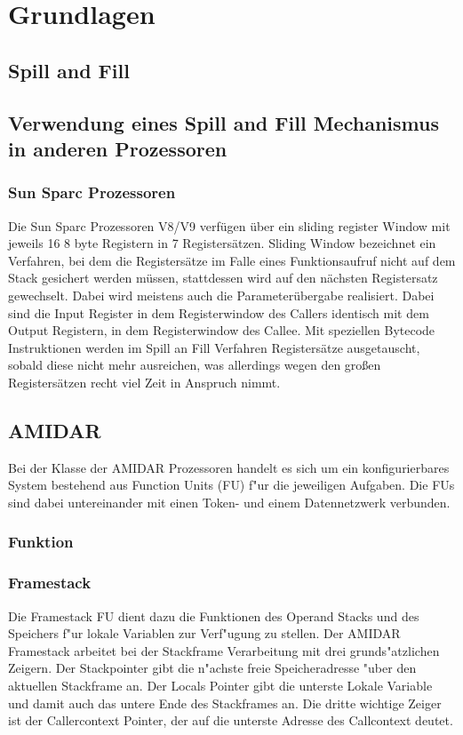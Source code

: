 \chapter{Grundlagen}
\label{cha:Grundlagen}

\section{Spill and Fill}
\section{Verwendung eines Spill and Fill Mechanismus in anderen Prozessoren}
\subsection{Sun Sparc Prozessoren}
Die Sun Sparc Prozessoren V8/V9 verf\"ugen \"uber ein sliding register Window mit jeweils 16 8 byte Registern in 7 Registers\"atzen. Sliding Window bezeichnet ein Verfahren, bei dem die Registers\"atze im Falle eines Funktionsaufruf nicht auf dem Stack gesichert werden m\"ussen, stattdessen wird auf den n\"achsten Registersatz gewechselt. Dabei wird meistens auch die Parameter\"ubergabe realisiert. Dabei sind die Input Register in dem Registerwindow des Callers identisch mit dem Output Registern, in dem Registerwindow des Callee.   
Mit speziellen Bytecode Instruktionen werden im Spill an Fill Verfahren Registers\"atze ausgetauscht, sobald diese nicht mehr ausreichen, was allerdings wegen den großen Registers\"atzen recht viel Zeit in Anspruch nimmt.
\section{AMIDAR}
Bei der Klasse der AMIDAR Prozessoren handelt es sich um ein konfigurierbares System bestehend aus Function Units (FU) f"ur die jeweiligen Aufgaben. Die FUs sind dabei untereinander mit einen Token- und einem Datennetzwerk verbunden. 
\subsection{Funktion}



\subsection{Framestack}

Die Framestack FU dient dazu die Funktionen des Operand Stacks und des Speichers f"ur lokale Variablen zur Verf"ugung zu stellen. 
Der AMIDAR Framestack arbeitet bei der Stackframe Verarbeitung mit drei grunds"atzlichen Zeigern. Der Stackpointer gibt die n"achste freie Speicheradresse "uber den aktuellen Stackframe an. Der Locals Pointer gibt die unterste Lokale Variable und damit auch das untere Ende des Stackframes an. Die dritte wichtige Zeiger ist der Callercontext Pointer, der auf die unterste Adresse des Callcontext deutet. 

